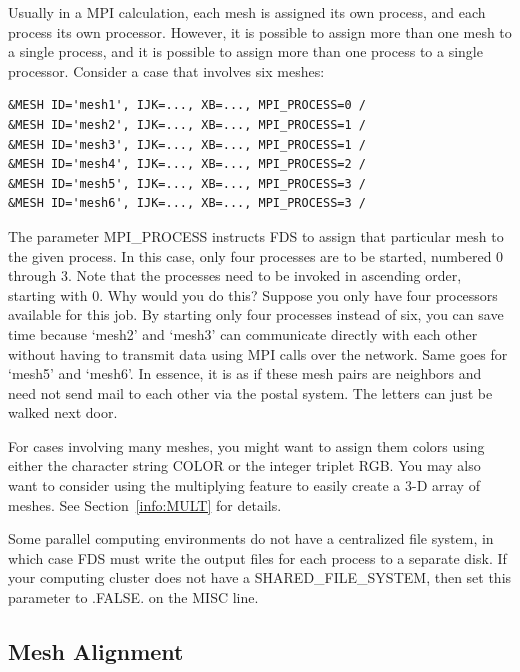 \documentclass[11pt]{book}
\begin{document}
Usually in a MPI calculation, each mesh is assigned its own process, and each process its own processor. However, it is possible to assign more than one mesh to a single process, and it is possible to assign more than one process to a single processor. Consider a case that involves six meshes:
\begin{lstlisting}
&MESH ID='mesh1', IJK=..., XB=..., MPI_PROCESS=0 /
&MESH ID='mesh2', IJK=..., XB=..., MPI_PROCESS=1 /
&MESH ID='mesh3', IJK=..., XB=..., MPI_PROCESS=1 /
&MESH ID='mesh4', IJK=..., XB=..., MPI_PROCESS=2 /
&MESH ID='mesh5', IJK=..., XB=..., MPI_PROCESS=3 /
&MESH ID='mesh6', IJK=..., XB=..., MPI_PROCESS=3 /
\end{lstlisting}
The parameter {\ct MPI\_PROCESS} instructs FDS to assign that particular mesh to the given process. In this case, only four processes are to be started, numbered 0 through 3. Note that the processes need to be invoked in ascending order, starting with 0. Why would you do this? Suppose you only have four processors available for this job. By starting only four processes instead of six, you can save time because `mesh2' and `mesh3' can communicate directly with each other without having to transmit data using MPI calls over the network. Same goes for `mesh5' and `mesh6'. In essence, it is as if these mesh pairs are neighbors and need not send mail to each other via the postal system. The letters can just be walked next door.

For cases involving many meshes, you might want to assign them colors using either the character string {\ct COLOR} or the integer triplet {\ct RGB}. You may also want to consider using the multiplying feature to easily create a 3-D array of meshes. See Section~\ref{info:MULT} for details.

Some parallel computing environments do not have a centralized file system, in which case FDS must write the output files for each process to a separate disk. If your computing cluster does not have a {\ct SHARED\_FILE\_SYSTEM}, then set this parameter to {\ct .FALSE.} on the {\ct MISC} line.


\subsection{Mesh Alignment}
\end{document}
